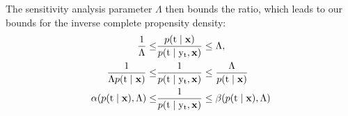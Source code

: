 The sensitivity analysis parameter $\Lambda$ then bounds the ratio, which leads to our bounds for the inverse complete propensity density:
\begin{equation}
    \begin{split}
        \frac{1}{\Lambda} \leq &\frac{p(\mathrm{t} \mid \mathbf{x})}{p(\mathrm{t} \mid \mathrm{y}_{\mathrm{t}}, \mathbf{x})} \leq \Lambda, \\
        \frac{1}{\Lambda p(\mathrm{t} \mid \mathbf{x})} \leq &\frac{1}{p(\mathrm{t} \mid \mathrm{y}_{\mathrm{t}}, \mathbf{x})} \leq \frac{\Lambda}{p(\mathrm{t} \mid \mathbf{x})} \\
        \alpha(p(\mathrm{t} \mid \mathbf{x}), \Lambda) \leq &\frac{1}{p(\mathrm{t} \mid \mathrm{y}_{\mathrm{t}}, \mathbf{x})} \leq \beta(p(\mathrm{t} \mid \mathbf{x}), \Lambda)
    \end{split}
\end{equation}


